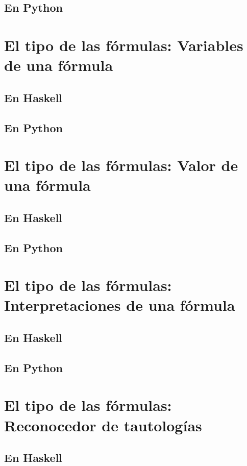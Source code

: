 \documentclass[a4paper,12pt,twoside]{book}
\begin{document}
\subsection*{En Python}

\section{El tipo de las fórmulas: Variables de una fórmula}
\subsection*{En Haskell}
\subsection*{En Python}

\section{El tipo de las fórmulas: Valor de una fórmula}
\subsection*{En Haskell}
\subsection*{En Python}

\section{El tipo de las fórmulas: Interpretaciones de una fórmula}
\subsection*{En Haskell}
\subsection*{En Python}

\section{El tipo de las fórmulas: Reconocedor de tautologías}
\subsection*{En Haskell}
\end{document}
